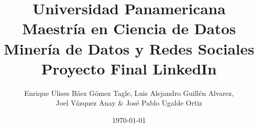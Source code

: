 \documentclass[12pt]{article}
\title{Universidad Panamericana \\ Maestría en Ciencia de Datos \\ Minería de Datos y Redes Sociales \\ \vspace{0.5cm} Proyecto Final LinkedIn}
\date{\today}
\author{Enrique Ulises Báez Gómez Tagle, Luis Alejandro Guillén Alvarez, \\Joel Vázquez Anay \& José Pablo Ugalde Ortiz }
\begin{document}
\maketitle
\section{}
\end{document}

